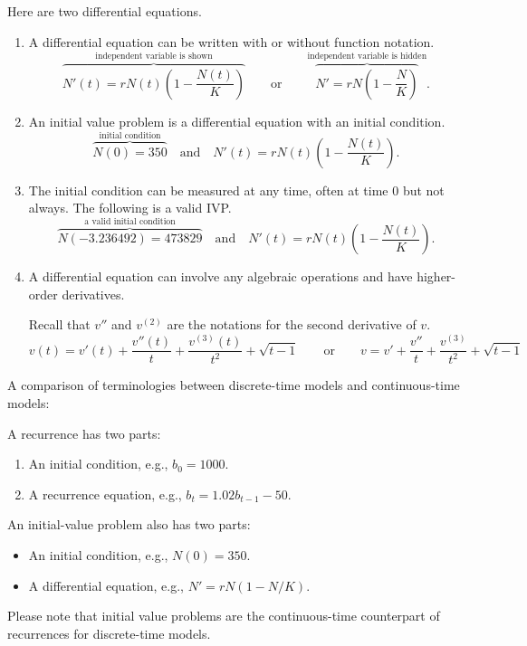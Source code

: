 \documentclass[../main.tex]{subfiles}
\begin{document}
\begin{example} \label{ex:de-notation-examples}
  Here are two differential equations.  

  \begin{enumerate}[wide]
    \item A differential equation can be written with or without function notation.
      \[
        {\overbrace{N'(t) = r N(t) \left(1-\frac{N(t)}{K}\right)}^{\text{independent variable is shown}}} 
        \qquad\text{or}\qquad 
        {\overbrace{N' = rN\left(1-\frac{N}{K}\right)}^{\text{independent variable is hidden}}}.
      \]


    \item An initial value problem is a differential equation with an initial condition.
      \[
        \overbrace{N(0) = 350}^{\text{initial condition}} \quad\text{and}\quad N'(t) = r N(t) \left(1-\frac{N(t)}{K}\right).
      \]
      \bigskip


    \item The initial condition can be measured at any time, often at time \(0\) but not always. The following is a valid IVP.
      \[
        \overbrace{N(-3.236492) = 473829}^{\text{a valid initial condition}} \quad\text{and}\quad N'(t) = r N(t) \left(1-\frac{N(t)}{K}\right).
      \]
      \bigskip

    \item A differential equation can involve any algebraic operations and have higher-order derivatives.

      Recall that \(v''\) and \(v^{(2)}\) are the notations for the second derivative of \(v\).
      \[
        v(t) = v'(t) + \frac{v''(t)}{t} + \frac{v^{(3)}(t)}{t^{2}} + \sqrt{t-1}
        \qquad\text{or}\qquad
        v = v' + \frac{v''}{t} + \frac{v^{(3)}}{t^{2}} + \sqrt{t-1}
      \]
  \end{enumerate}
\end{example}
\clearpage

A comparison of terminologies between discrete-time models and continuous-time models:

A recurrence has two parts:
\begin{enumerate}
  \item An initial condition, e.g., \(b_{0} = 1000\).
  \item A recurrence equation, e.g., \(b_{t} = 1.02 b_{t-1} - 50\).
\end{enumerate}

An initial-value problem also has two parts:
\begin{itemize}
  \item An initial condition, e.g., \(N(0) = 350\).
  \item A differential equation, e.g., \(N' = rN(1 - N/K)\). 
\end{itemize}

Please note that initial value problems are the continuous-time counterpart of recurrences for discrete-time models.
\end{document}
